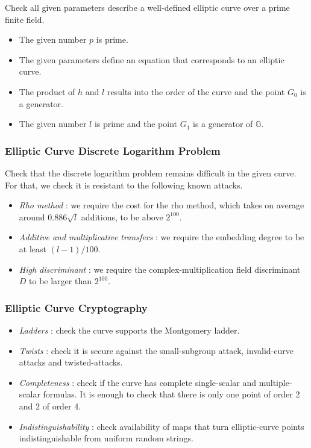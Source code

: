 \documentclass{article}
\newcommand{\G}{\ensuremath{\mathbb{G}}}
\theoremstyle{definition}
\theoremstyle{remark}
\begin{document}
\begin{spacing}{1.2}
\begin{multicols}{2}
Check all given parameters describe a well-defined elliptic curve over a prime finite field.

\begin{itemize}
	\item The given number $p$ is prime.
	\item The given parameters define an equation that corresponds to an elliptic curve.
	\item The product of $h$ and $l$ results into the order of the curve and the point $G_0$ is a generator.
	\item The given number $l$ is prime and the point $G_1$ is a generator of $\G$.
\end{itemize}

\subsubsection*{Elliptic Curve Discrete Logarithm Problem}

Check that the discrete logarithm problem remains difficult in the given curve. For that, we check it is resistant to the following known attacks. %

\begin{itemize}
	\item {\it Rho method} \cite[Sec. V.1]{seroussi}: we require the cost for the rho method, which takes on average around $0.886 \sqrt{l}$ additions, to be above $2^{100}$.	
	\item {\it Additive and multiplicative %
				transfers} \cite[Sec. V.2]{seroussi}: we require the embedding degree to be at least $(l-1)/100$.
	\item {\it High discriminant} \cite[Sec. IX.3]{seroussi}: we require the complex-multiplication field discriminant $D$ to be larger than $2^{100}$. 
\end{itemize}
	
\subsubsection*{Elliptic Curve Cryptography}

\begin{itemize}
	\item {\it Ladders} \cite{montgomery}:   check the curve supports the Montgomery ladder. 
	\item {\it Twists} \cite[twist]{safe-curves}: check it is secure against the small-subgroup attack, invalid-curve attacks and twisted-attacks.
	\item {\it Completeness} \cite[complete]{safe-curves}: check if the curve has complete single-scalar and multiple-scalar formulas. It is enough to check that there is only one point of order 2 and 2 of order 4. 
	\item {\it Indistinguishability} \cite{indist}: check availability of maps that turn elliptic-curve points indistinguishable from uniform random strings.
\end{itemize}



\end{multicols}
\end{spacing}
\end{document}
